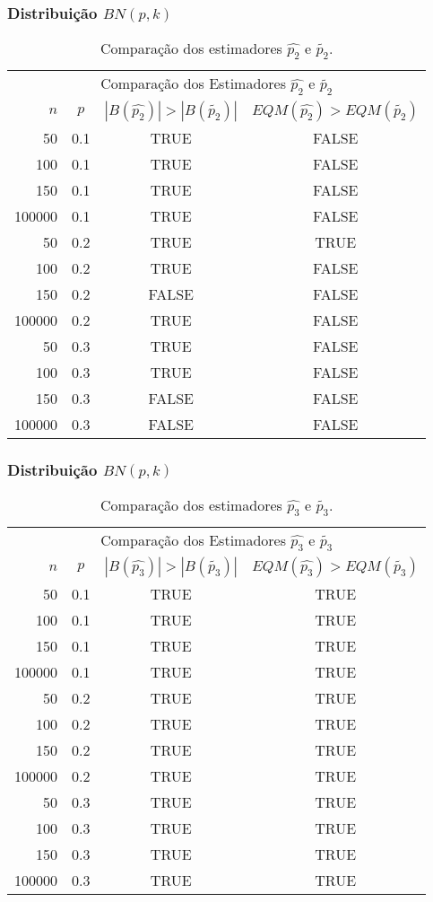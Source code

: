\begin{frame}
\frametitle{Distribuição $BN(p,k)$}
\tiny
\begin{table}[h]
\caption{Comparação dos estimadores $\hat{p_{2}}$ e $\tilde{p_{2}}$.}
\label{tab:p2}
\centering
\begin{tabular}{rccc}
\toprule
\multicolumn{4}{c}{Comparação dos Estimadores $\hat{p_{2}}$ e $\tilde{p_{2}}$}\\
$n$ & $p$ & $|B(\hat{p_{2}})|>|B(\tilde{p_{2}})|$ & $EQM(\hat{p_{2}})>EQM(\tilde{p_{2}})$ \\
\midrule
50 & 0.1 & TRUE & FALSE \\
100 & 0.1 & TRUE & FALSE \\
150 & 0.1 & TRUE & FALSE \\
100000 & 0.1 & TRUE & FALSE \\
\midrule
50 & 0.2 & TRUE & TRUE \\
100 & 0.2 & TRUE & FALSE \\
150 & 0.2 & FALSE & FALSE\\
100000 & 0.2 & TRUE & FALSE \\
\midrule
50 & 0.3 & TRUE & FALSE \\
100 & 0.3 & TRUE & FALSE \\
150 & 0.3 & FALSE & FALSE \\
100000 & 0.3 & FALSE & FALSE \\
\bottomrule
\end{tabular}
\end{table}
\end{frame}

\begin{frame}
\frametitle{Distribuição $BN(p,k)$}
\tiny
\begin{table}[h]
\caption{Comparação dos estimadores $\hat{p_{3}}$ e $\tilde{p_{3}}$.}
\label{tab:p2}
\centering
\begin{tabular}{rccc}
\toprule
\multicolumn{4}{c}{Comparação dos Estimadores $\hat{p_{3}}$ e $\tilde{p_{3}}$}\\
$n$ & $p$ & $|B(\hat{p_{3}})|>|B(\tilde{p_{3}})|$ & $EQM(\hat{p_{3}})>EQM(\tilde{p_{3}})$ \\
\midrule
50 & 0.1 & TRUE & TRUE \\
100 & 0.1 & TRUE & TRUE \\
150 & 0.1 & TRUE & TRUE \\
100000 & 0.1 & TRUE & TRUE \\
\midrule
50 & 0.2 & TRUE & TRUE \\
100 & 0.2 & TRUE & TRUE \\
150 & 0.2 & TRUE & TRUE \\
100000 & 0.2 & TRUE & TRUE \\
\midrule
50 & 0.3 & TRUE & TRUE \\
100 & 0.3 & TRUE & TRUE \\
150 & 0.3 & TRUE & TRUE \\
100000 & 0.3 & TRUE & TRUE \\
\bottomrule
\end{tabular}
\end{table}
\end{frame}